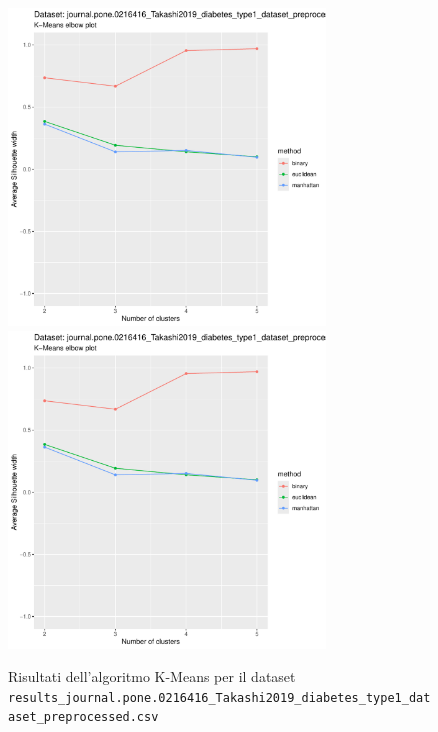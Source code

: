 \documentclass[12pt]{report}
\begin{document}
			\begin{figure}[h]
				\centering
				\includegraphics[width = 0.75\textwidth, height = 0.45\textheight, page = 1]{
					results/results_journal.pone.0216416_Takashi2019_diabetes_type1_dataset_preprocessed.csv.pdf
				}
				\includegraphics[width = 0.75\textwidth, height = 0.45\textheight, page = 2]{
					results/results_journal.pone.0216416_Takashi2019_diabetes_type1_dataset_preprocessed.csv.pdf
				}
				\caption{Risultati dell'algoritmo K-Means per il dataset
				\texttt{results\_journal.pone.0216416\_Takashi2019\_diabetes\_type1\_dataset\_preprocessed.csv}}
				\label{fig:kmeans4}
			\end{figure}
\end{document}
